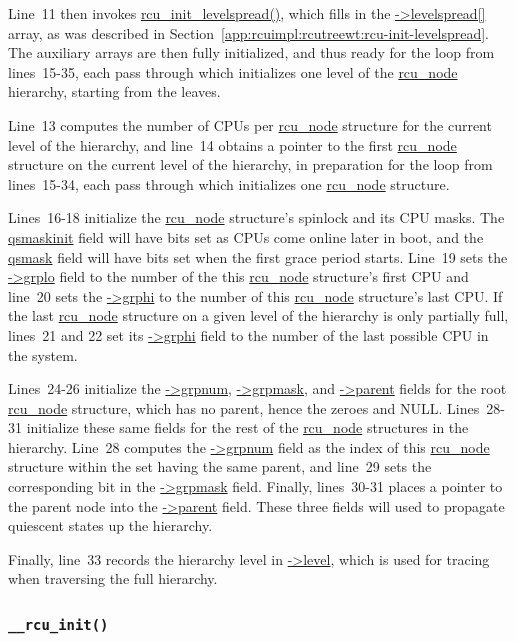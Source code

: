 Line~11 then invokes \url{rcu_init_levelspread()}, which fills in the
\url{->levelspread[]} array, as was described in
Section~\ref{app:rcuimpl:rcutreewt:rcu-init-levelspread}.
The auxiliary arrays are then fully initialized, and thus ready for
the loop from lines~15-35, each pass through which initializes
one level of the \url{rcu_node} hierarchy, starting from the leaves.

Line~13 computes the number of CPUs per \url{rcu_node} structure for
the current level of the hierarchy, and line~14 obtains a pointer
to the first \url{rcu_node} structure on the current level of the
hierarchy, in preparation for the loop from lines~15-34, each pass
through which initializes one \url{rcu_node} structure.

Lines~16-18 initialize the \url{rcu_node} structure's spinlock and
its CPU masks.
The \url{qsmaskinit} field will have bits set as CPUs come online
later in boot, and the \url{qsmask} field will have bits set
when the first grace period starts.
Line~19 sets the \url{->grplo} field to the number of the this
\url{rcu_node} structure's first CPU and line~20 sets the
\url{->grphi} to the number of this \url{rcu_node} structure's
last CPU.
If the last \url{rcu_node} structure on a given level of the
hierarchy is only partially full, lines~21 and 22 set its
\url{->grphi} field to the number of the last possible CPU in the system.

Lines~24-26 initialize the \url{->grpnum}, \url{->grpmask}, and
\url{->parent} fields for the root \url{rcu_node} structure, which
has no parent, hence the zeroes and NULL.
Lines~28-31 initialize these same fields for the rest of the
\url{rcu_node} structures in the hierarchy.
Line~28 computes the \url{->grpnum} field as the index of this
\url{rcu_node} structure within
the set having the same parent, and 
line~29 sets the corresponding bit in the \url{->grpmask} field.
Finally, lines~30-31 places a pointer to the parent node into the
\url{->parent} field.
These three fields will used to propagate quiescent states up the
hierarchy.

Finally, line~33 records the hierarchy level in \url{->level},
which is used for tracing when traversing the full hierarchy.

\subsubsection{\tt \_\_rcu\_init()}
\label{app:rcuimpl:rcutreewt:rcu-init}

